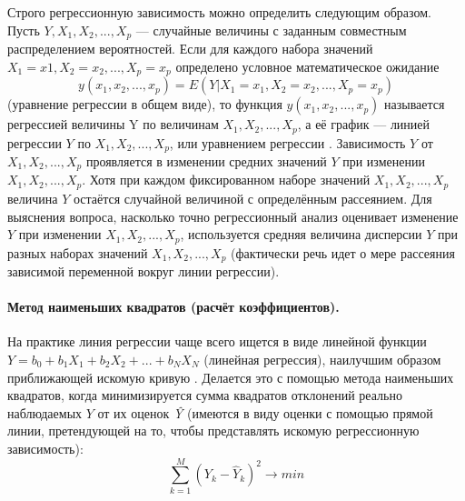 Строго регрессионную зависимость можно определить следующим образом. Пусть $Y, X_1, X_2,...,X_p$  — случайные величины с заданным совместным распределением вероятностей. Если для каждого набора значений $X_1=x1,X_2=x_2,...,X_p=x_p$ определено условное математическое ожидание
\begin{equation}
y(x_1,x_2,...,x_p) = E(Y|X_1 = x_1, X_2 = x_2, ..., X_p = x_p)
\end{equation}
(уравнение регрессии в общем виде), то функция $y(x_1,x_2,...,x_p)$ называется регрессией величины Y по величинам $X_1,X_2,...,X_p$, а её график — линией регрессии $Y$ по $X_1,X_2,...,X_p$, или уравнением регрессии \cite{applregr}.
Зависимость $Y$ от $X_1,X_2,...,X_p$ проявляется в изменении средних значений $Y$ при изменении $X_1,X_2,...,X_p$. Хотя при каждом фиксированном наборе значений $X_1,X_2,...,X_p$ величина $Y$ остаётся случайной величиной с определённым рассеянием.
Для выяснения вопроса, насколько точно регрессионный анализ оценивает изменение $Y$ при изменении $X_1,X_2,...,X_p$, используется средняя величина дисперсии $Y$ при разных наборах значений $X_1,X_2,...,X_p$ (фактически речь идет о мере рассеяния зависимой переменной вокруг линии регрессии).

\paragraph{Метод наименьших квадратов (расчёт коэффициентов).}

На практике линия регрессии чаще всего ищется в виде линейной функции $Y = b_0 + b_1 X_1 + b_2 X_2 + ... + b_N X_N$ (линейная регрессия), наилучшим образом приближающей искомую кривую \cite{regrmeth}. Делается это с помощью метода наименьших квадратов, когда минимизируется сумма квадратов отклонений реально наблюдаемых $Y$ от их оценок \textit{\^Y} (имеются в виду оценки с помощью прямой линии, претендующей на то, чтобы представлять искомую регрессионную зависимость):
\begin{equation}
\sum\limits_{k=1}^{M}{(Y_k - \hat{Y}_k)^2} \rightarrow min
\end{equation}

